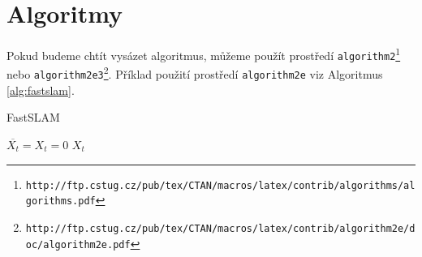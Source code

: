 \documentclass[a4paper, 11pt]{article}
\begin{document}
\section{Algoritmy}
\label{sec:algo}
Pokud budeme chtít vysázet algoritmus, můžeme použít prostředí \texttt{algorithm2\footnote{http://ftp.cstug.cz/pub/tex/CTAN/macros/latex/contrib/algorithms/algorithms.pdf}} nebo \texttt{algorithm2e3\footnote{http://ftp.cstug.cz/pub/tex/CTAN/macros/latex/contrib/algorithm2e/doc/algorithm2e.pdf}}. 
Příklad použití prostředí \texttt{algorithm2e} viz Algoritmus \ref{alg:fastslam}.

\SetAlgoNoLine
\SetNlSty{}{}{:}
\begin{algorithm}[h]
\caption{FastSLAM}
\label{alg:fastslam}
\DontPrintSemicolon
\Indm
{}
\Indp

$\overline{X_{t}} = X_{t} = 0 $\;
\Return $X_{t}$\;   %

\end{algorithm}
\end{document}
